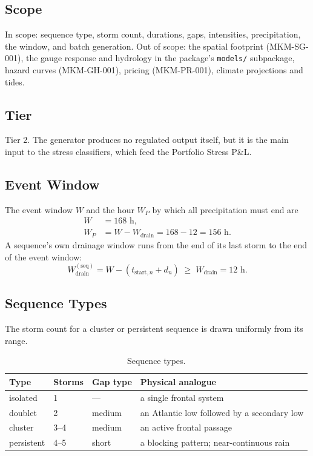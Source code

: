 \documentclass[11pt,a4paper]{article}
\begin{document}
\subsection{Scope}
In scope: sequence type, storm count, durations, gaps, intensities, precipitation, the
window, and batch generation. Out of scope: the spatial footprint (MKM-SG-001), the
gauge response and hydrology in the package's \texttt{models/} subpackage, hazard curves
(MKM-GH-001), pricing (MKM-PR-001), climate projections and tides.

\subsection{Tier}
Tier 2. The generator produces no regulated output itself, but it is the main input to the
stress classifiers, which feed the Portfolio Stress P\&L.

\mkmframework

\subsection{Event Window}
The event window $W$ and the hour $W_P$ by which all precipitation must end are
\begin{align}
    W &= 168\text{ h}, \label{eq:w}\\
    W_P &= W - W_{\text{drain}} = 168 - 12 = 156\text{ h}. \label{eq:wp}
\end{align}
A sequence's own drainage window runs from the end of its last storm to the end of the
event window:
\begin{equation}
    W^{(\text{seq})}_{\text{drain}} = W - (t_{\text{start},n} + d_n) \;\ge\; W_{\text{drain}} = 12\text{ h}.
    \label{eq:drain}
\end{equation}

\subsection{Sequence Types}
The storm count for a cluster or persistent sequence is drawn uniformly from its range.
\begin{table}[H]
\centering\small
\caption{Sequence types.}\label{tab:types}
\begin{tabular}{llll}
\toprule
Type & Storms & Gap type & Physical analogue \\
\midrule
isolated & 1 & --- & a single frontal system \\
doublet & 2 & medium & an Atlantic low followed by a secondary low \\
cluster & 3--4 & medium & an active frontal passage \\
persistent & 4--5 & short & a blocking pattern; near-continuous rain \\
\bottomrule
\end{tabular}
\end{table}
\end{document}
